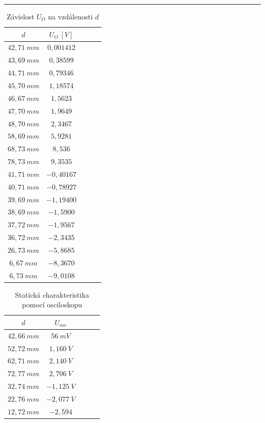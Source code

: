 \documentclass[a4paper,12pt]{article}
\begin{document}
\par\noindent\rule{\textwidth}{0.4pt}
\begin{table}[H]
\centering
\begin{tabular}{|c|c|c|c|c|}
\hline
$d$ & $U_O\ [V]$ \\
\hline
$42,71\ mm$ & $0,001412$\\
\hline
$43,69\ mm$ & $0,38599$\\
\hline
$44,71\ mm$ & $0,79346$\\
\hline
$45,70\ mm$ & $1,18574$\\
\hline
$46,67\ mm$ & $1,5623$\\
\hline
$47,70\ mm$ & $1,9649$\\
\hline
$48,70\ mm$ & $2,3467$\\
\hline
$58,69\ mm$ & $5,9281$\\
\hline
$68,73\ mm$ & $8,536$\\
\hline
$78,73\ mm$ & $9,3535$\\
\hline
\hline
$41,71\ mm$ & $-0,40167$\\
\hline
$40,71\ mm$ & $-0,78927$\\
\hline
$39,69\ mm$ & $-1,19400$\\
\hline
$38,69\ mm$ & $-1,5900$\\
\hline
$37,72\ mm$ & $-1,9567$\\
\hline
$36,72\ mm$ & $-2,3435$\\
\hline
$26,73\ mm$ & $-5,8685$\\
\hline
$6,67\ mm$ & $-8,3670$\\
\hline
$6,73\ mm$ & $-9,0108$\\
\hline
\end{tabular}
\caption{Závislost $U_O$ na vzdálenosti $d$}
\end{table}

\begin{table}[H]
\centering
\begin{tabular}{|c|c|c|c|c|}
\hline
$d$ & $U_{osc}$ \\
\hline
$42,66\ mm$ & $56\ mV$\\
\hline
$52,72\ mm$ & $1,160\ V$\\
\hline
$62,71\ mm$ & $2,140\ V$\\
\hline
$72,77\ mm$ & $2,706\ V$\\
\hline
$32,74\ mm$ & $-1,125\ V$\\
\hline
$22,76\ mm$ & $-2,077\ V$\\
\hline
$12,72\ mm$ & $-2,594$\\
\hline
\end{tabular}
\caption{Statická charakteristika pomocí osciloskopu}
\end{table}
\end{document}
